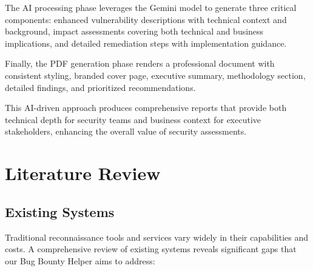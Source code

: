 \documentclass[conference]{IEEEtran}
\begin{document}
The AI processing phase leverages the Gemini model to generate three critical components: enhanced vulnerability descriptions with technical context and background, impact assessments covering both technical and business implications, and detailed remediation steps with implementation guidance.

Finally, the PDF generation phase renders a professional document with consistent styling, branded cover page, executive summary, methodology section, detailed findings, and prioritized recommendations.

This AI-driven approach produces comprehensive reports that provide both technical depth for security teams and business context for executive stakeholders, enhancing the overall value of security assessments.

\section{Literature Review}
\subsection{Existing Systems}
Traditional reconnaissance tools and services vary widely in their capabilities and costs. A comprehensive review of existing systems reveals significant gaps that our Bug Bounty Helper aims to address:
\end{document}
